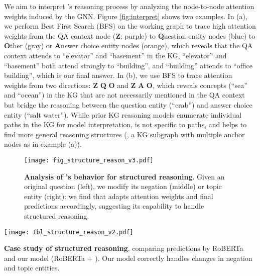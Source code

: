 We aim to interpret \methodname's reasoning process by analyzing the node-to-node attention weights induced by the GNN. 
Figure \ref{fig:interpret} shows two examples. In (a), we perform Best First Search (BFS) on the working graph to trace high attention weights from the QA context node (\textbf{Z}; purple) to \textbf{Q}uestion entity nodes (blue) to \textbf{O}ther (gray) or \textbf{A}nswer choice entity nodes (orange), which reveals that the QA context  attends to ``elevator'' and ``basement'' in the KG, ``elevator'' and ``basement'' both attend strongly to ``building'', and ``building'' attends to ``office building'', which is our final answer. 
In (b), we use BFS to trace attention weights from two directions: 
\textbf{Z}  \textbf{Q}  \textbf{O} and \textbf{Z}  \textbf{A}  \textbf{O}, which reveals concepts (``sea'' and ``ocean'') in the KG that are not necessarily mentioned in the QA context but bridge the reasoning between the question entity (``crab'') and answer choice entity (``salt water'').
While prior KG reasoning models \cite{lin2019kagnet,feng2020scalable} enumerate individual paths in the KG for model interpretation, \methodname is not specific to paths, and helps to find more general reasoning structures (\eg, a KG subgraph with multiple anchor nodes as in example (a)).




\begin{figure*}[!th]
    \vspace{-5mm}
    \hspace{-1mm}
    \centering \texttt{[image: fig\_structure\_reason\_v3.pdf]}
\vspace{-1mm}
    \caption{\textbf{Analysis of \methodname's behavior for structured reasoning}. Given an original question (left), we modify its negation (middle) or topic entity (right): we find that \methodname adapts attention weights and final predictions accordingly, suggesting its capability to handle structured reasoning.
    }
    \vspace{-2mm}
\label{fig:structure_reason}
\end{figure*}

\begin{table*}[!th]
    \vspace{-0mm}
    \hspace{-1mm}
    \centering \texttt{[image: tbl\_structure\_reason\_v2.pdf]}
    \vspace{-2mm}
    \caption{\textbf{Case study of structured reasoning}, comparing predictions by RoBERTa and our model (RoBERTa + \methodname). Our model correctly handles changes in negation and topic entities.
    }
\label{tbl:structure_reason}
\end{table*}


